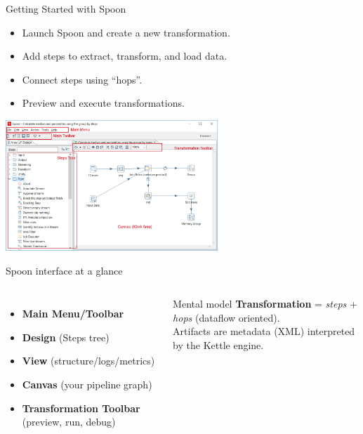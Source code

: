\documentclass[aspectratio=169]{beamer}
\begin{document}
\begin{frame}{Getting Started with Spoon}
    \begin{itemize}
        \small
        \item Launch Spoon and create a new transformation.
        \item Add steps to extract, transform, and load data.
        \item Connect steps using ``hops''.
        \item Preview and execute transformations.
    \end{itemize}
    \vspace{2mm}
    \centering
    \includegraphics[width=0.6\textwidth]{figures/spoon_ui}
\end{frame}

\begin{frame}{Spoon interface at a glance}
    \begin{columns}[T,onlytextwidth]
        \begin{itemize}
            \item \textbf{Main Menu/Toolbar}
            \item \textbf{Design} (Steps tree)
            \item \textbf{View} (structure/logs/metrics)
            \item \textbf{Canvas} (your pipeline graph)
            \item \textbf{Transformation Toolbar} (preview, run, debug)
        \end{itemize}
        \begin{block}{Mental model}
            \textbf{Transformation} = \emph{steps} + \emph{hops} (dataflow oriented).\\
            Artifacts are metadata (XML) interpreted by the Kettle engine.
        \end{block}
    \end{columns}
\end{frame}
\end{document}
